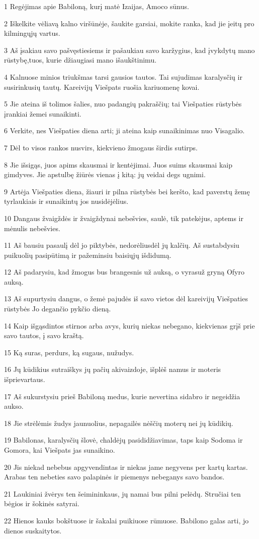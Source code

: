 \par 1 Regėjimas apie Babiloną, kurį matė Izaijas, Amoco sūnus. 
\par 2 Iškelkite vėliavą kalno viršūnėje, šaukite garsiai, mokite ranka, kad jie įeitų pro kilmingųjų vartus. 
\par 3 Aš įsakiau savo pašvęstiesiems ir pašaukiau savo karžygius, kad įvykdytų mano rūstybę,­tuos, kurie džiaugiasi mano išaukštinimu. 
\par 4 Kalnuose minios triukšmas tarsi gausios tautos. Tai sujudimas karalysčių ir susirinkusių tautų. Kareivijų Viešpats ruošia kariuomenę kovai. 
\par 5 Jie ateina iš tolimos šalies, nuo padangių pakraščių; tai Viešpaties rūstybės įrankiai žemei sunaikinti. 
\par 6 Verkite, nes Viešpaties diena arti; ji ateina kaip sunaikinimas nuo Visagalio. 
\par 7 Dėl to visos rankos nusvirs, kiekvieno žmogaus širdis sutirps. 
\par 8 Jie išsigąs, juos apims skausmai ir kentėjimai. Juos suims skausmai kaip gimdyves. Jie apstulbę žiūrės vienas į kitą: jų veidai degs ugnimi. 
\par 9 Artėja Viešpaties diena, žiauri ir pilna rūstybės bei keršto, kad paverstų žemę tyrlaukiais ir sunaikintų jos nusidėjėlius. 
\par 10 Dangaus žvaigždės ir žvaigždynai nebešvies, saulė, tik patekėjus, aptems ir mėnulis nebešvies. 
\par 11 Aš bausiu pasaulį dėl jo piktybės, nedorėlius­dėl jų kalčių. Aš sustabdysiu puikuolių pasipūtimą ir pažeminsiu baisiųjų išdidumą. 
\par 12 Aš padarysiu, kad žmogus bus brangesnis už auksą, o vyras­už gryną Ofyro auksą. 
\par 13 Aš supurtysiu dangus, o žemė pajudės iš savo vietos dėl kareivijų Viešpaties rūstybės Jo degančio pykčio dieną. 
\par 14 Kaip išgąsdintos stirnos arba avys, kurių niekas nebegano, kiekvienas grįš prie savo tautos, į savo kraštą. 
\par 15 Ką suras, perdurs, ką sugaus, nužudys. 
\par 16 Jų kūdikius sutraiškys jų pačių akivaizdoje, išplėš namus ir moteris išprievartaus. 
\par 17 Aš sukurstysiu prieš Babiloną medus, kurie nevertina sidabro ir negeidžia aukso. 
\par 18 Jie strėlėmis žudys jaunuolius, nepagailės nėščių moterų nei jų kūdikių. 
\par 19 Babilonas, karalysčių šlovė, chaldėjų pasididžiavimas, taps kaip Sodoma ir Gomora, kai Viešpats jas sunaikino. 
\par 20 Jis niekad nebebus apgyvendintas ir niekas jame negyvens per kartų kartas. Arabas ten nebeties savo palapinės ir piemenys nebeganys savo bandos. 
\par 21 Laukiniai žvėrys ten šeimininkaus, jų namai bus pilni pelėdų. Stručiai ten bėgios ir šokinės satyrai. 
\par 22 Hienos kauks bokštuose ir šakalai puikiuose rūmuose. Babilono galas arti, jo dienos suskaitytos.



